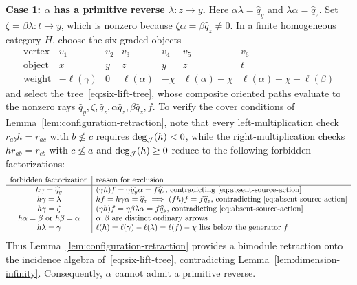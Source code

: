 \medskip
\noindent\textbf{Case 1: $\alpha$ has a primitive reverse $\lambda\colon z\to y$.}
Here $\alpha\lambda=\widehat q_y$ and $\lambda\alpha=\widehat q_z$. Set $\zeta=\beta\lambda\colon t\to y$, which is nonzero because $\zeta\alpha=\beta\widehat q_z\ne0$. In a finite homogeneous category $H$, choose the six graded objects
\begin{equation}
  \begin{array}{c|rrrrrr}
  \text{vertex}&v_1&v_2&v_3&v_4&v_5&v_6\\ \hline
  \text{object}&x&y&z&y&z&t\\
  \text{weight}&-\ell(\gamma)&0&\ell(\alpha)&-\chi&\ell(\alpha)-\chi&\ell(\alpha)-\chi-\ell(\beta)
  \end{array}
  \label{eq:six-lift-coordinates}
\end{equation}
and select the tree~\eqref{eq:six-lift-tree}, whose composite oriented paths evaluate to the nonzero rays $\widehat q_y,\zeta,\widehat q_z,\alpha\widehat q_z,\beta\widehat q_z,f$. To verify the cover conditions of Lemma~\ref{lem:configuration-retraction}, note that every left-multiplication check $r_{ab}h=r_{ac}$ with $b\nleq c$ requires $\deg_\mathcal J(h)<0$, while the right-multiplication checks $hr_{ab}=r_{cb}$ with $c\nleq a$ and $\deg_\mathcal J(h)\geq0$ reduce to the following forbidden factorizations:
\[
  \begin{array}{c|l}
  \text{forbidden factorization}&\text{reason for exclusion}\\ \hline
  h\gamma=\widehat q_y&(\gamma h)f=\gamma\widehat q_y\alpha=f\widehat q_z\text{, contradicting~\eqref{eq:absent-source-action}}\\
  h\gamma=\lambda&hf=h\gamma\alpha=\widehat q_z\implies(fh)f=f\widehat q_z\text{, contradicting~\eqref{eq:absent-source-action}}\\
  h\gamma=\zeta&(\eta h)f=\eta\beta\lambda\alpha=f\widehat q_z\text{, contradicting~\eqref{eq:absent-source-action}}\\
  h\alpha=\beta\text{ or }h\beta=\alpha&\alpha,\beta\text{ are distinct ordinary arrows}\\
  h\lambda=\gamma&\ell(h)=\ell(\gamma)-\ell(\lambda)=\ell(f)-\chi\text{ lies below the generator }f
  \end{array}
\]
Thus Lemma~\ref{lem:configuration-retraction} provides a bimodule retraction onto the incidence algebra of~\eqref{eq:six-lift-tree}, contradicting Lemma~\ref{lem:dimension-infinity}. Consequently, $\alpha$ cannot admit a primitive reverse.

